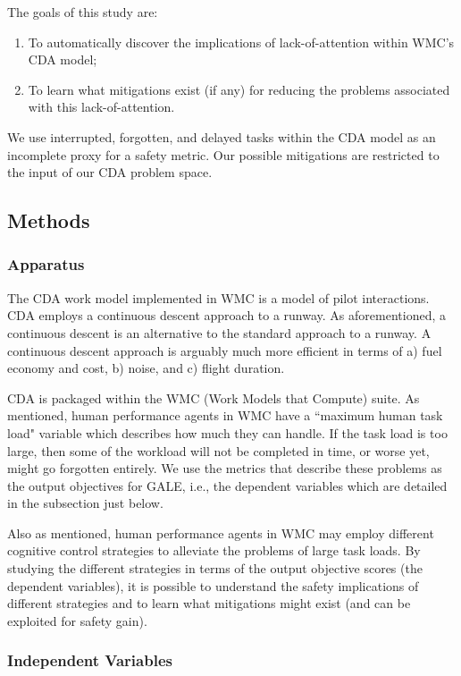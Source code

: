 \documentclass[journal]{IEEEtran}
\newcommand{\be}{\begin{enumerate}}
\newcommand{\ee}{\end{enumerate}}
\newcommand{\ADD}[1]{#1}
\begin{document}
The goals of this study are:
\be
\item
To automatically discover the implications of lack-of-attention within WMC's CDA model;
\item
To learn what mitigations exist (if any) for reducing the problems associated with this lack-of-attention.
\ee
\ADD{We use interrupted, forgotten, and delayed tasks within the CDA model as an incomplete proxy for a safety metric.
Our possible mitigations are restricted to the input of our CDA problem space.}


\subsection{Methods}
\subsubsection{Apparatus}

 
The CDA work model implemented in WMC is a model of pilot interactions.
CDA employs a continuous descent approach to a runway. 
As aforementioned, a continuous descent is an alternative to the standard approach to a runway.
A continuous descent approach is arguably much more efficient in terms of a) fuel economy and cost, b) noise, and c) flight duration.

CDA is packaged within the WMC (Work Models that Compute) suite.  
As mentioned, human performance agents in WMC have a ``maximum human task load" variable which describes how much they can handle.  
If the task load is too large, then some of the workload will not be completed in time, or worse yet, might go forgotten entirely.  
We use the metrics that describe these problems as the output objectives for GALE, i.e., the dependent variables which are detailed in the subsection just below.

Also as mentioned, human performance agents in WMC may employ different cognitive
control strategies to alleviate the problems of large task loads.   
By studying the different strategies in terms of the output objective scores (the dependent variables), it is possible to understand the safety implications of different strategies and to learn what mitigations might exist (and can be exploited for safety gain).


\subsubsection{Independent Variables}
\end{document}
